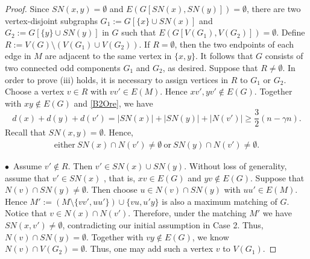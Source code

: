 \documentclass[11pt, a4paper]{article}
\theoremstyle{definition}
\newcommand{\<}{\subseteq}
\begin{document}
\begin{proof}
Since $SN(x,y)=\emptyset$ and $E(G[SN(x),SN(y)])=\emptyset$, there are two vertex-disjoint subgraphs $G_1:=G[\{x\}\cup SN(x)]$ and $G_2:=G[\{y\}\cup SN(y)]$ in $G$ such that $E(G[V(G_1),V(G_2)])=\emptyset$. Define $R:=V(G)\setminus (V(G_1)\cup V(G_2))$. If $R=\emptyset$, then the two endpoints of each edge in $M$ are adjacent to the same vertex in $\{x, y\}$. It follows that $G$ consists of two connected odd components $G_1$ and $G_2$, as desired. Suppose that $R\neq \emptyset$. In order to prove (iii) holds, it is necessary to assign vertices in $R$ to $G_1$ or $G_2$. Choose a vertex $v \in R$ with $vv'\in E(M)$. Hence $xv',yv'\notin E(G)$. Together with $xy\notin E(G)$ and \eqref{B2Ore}, we have 
$$
d(x)+d(y)+d(v')=|SN(x)|+|SN(y)|+|N(v')|\geq \frac{3}{2}(n-\gamma n).
$$
Recall that $SN(x,y)=\emptyset$. Hence, 
\begin{align}\label{eitheror}
    \text{either}\ SN(x)\cap N(v')\ne \emptyset\ \text{or}\ SN(y)\cap N(v')\ne \emptyset.
\end{align}



$\bullet$\ Assume  $v'\notin R$. Then $v'\in SN(x)\cup SN(y)$. Without loss of generality, assume that $v'\in SN(x)$%
, that is, $xv\in E(G)$ and $yv\notin E(G)$. Suppose that $N(v)\cap SN(y)\ne \emptyset$. Then choose $u\in N(v)\cap SN(y)$ with $uu'\in E(M)$. Hence $M':=(M\setminus \{vv',uu'\})  \cup \{vu,u'y\}$  is also a maximum matching of $G$. Notice that $v\in N(x)\cap N(v')$. Therefore, under the matching $M'$ we have $SN(x,v')\neq \emptyset$, contradicting our initial assumption in Case 2. Thus, $N(v)\cap SN(y)= \emptyset$. Together with $vy\notin E(G)$, we know $N(v)\cap V(G_2)=\emptyset$. Thus, one may add such a vertex $v$ to $V(G_1)$. %


\end{proof}
\end{document}
